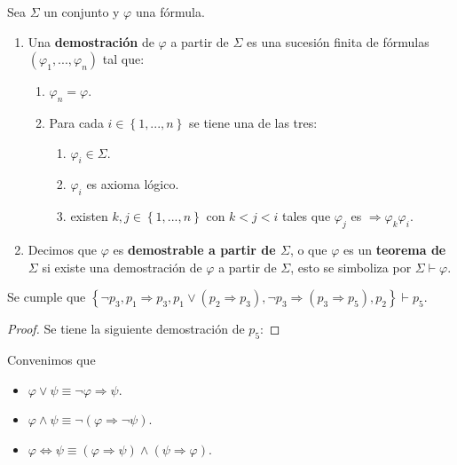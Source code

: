\documentclass[12pt]{report}
\theoremstyle{largebreak}
\begin{document}
    \begin{mydef}
        Sea $\Sigma$ un conjunto y $\varphi$ una fórmula.
        \begin{enumerate}
            \item Una \textbf{demostración} de $\varphi$ a partir de $\Sigma$ es una sucesión finita de fórmulas $(\varphi_1,...,\varphi_n)$ tal que:
            \begin{enumerate}
                \item $\varphi_n=\varphi$.
                \item Para cada $i\in\left\{1,...,n\right\}$ se tiene una de las tres:
                \begin{enumerate}
                    \item $\varphi_i\in\Sigma$.
                    \item $\varphi_i$ es axioma lógico.
                    \item existen $k,j\in\left\{1,...,n\right\}$ con $k<j<i$ tales que $\varphi_j$ es $\Rightarrow\varphi_k\varphi_i$.
                \end{enumerate}
            \end{enumerate}
            \item Decimos que $\varphi$ es \textbf{demostrable a partir de $\Sigma$}, o que $\varphi$ es un \textbf{teorema de $\Sigma$} si existe una demostración de $\varphi$ a partir de $\Sigma$, esto se simboliza por $\Sigma\vdash\varphi$.
        \end{enumerate}
    \end{mydef}

    \begin{exa}
        Se cumple que $\left\{\neg p_3,p_1\Rightarrow p_3,p_1\lor(p_2\Rightarrow p_3),\neg p_3\Rightarrow(p_3\Rightarrow p_5),p_2 \right\}\vdash p_5$.    
    \end{exa}

    \begin{proof}
        Se tiene la siguiente demostración de $p_5$:
        
    \end{proof}

    \begin{mydef}
        Convenimos que
        \begin{itemize}
            \item $\varphi\lor\psi\equiv\neg\varphi\Rightarrow\psi$.
            \item $\varphi\land\psi\equiv\neg(\varphi\Rightarrow\neg\psi)$.
            \item $\varphi\iff\psi\equiv(\varphi\Rightarrow\psi)\land(\psi\Rightarrow\varphi)$.
        \end{itemize}
    \end{mydef}
\end{document}
